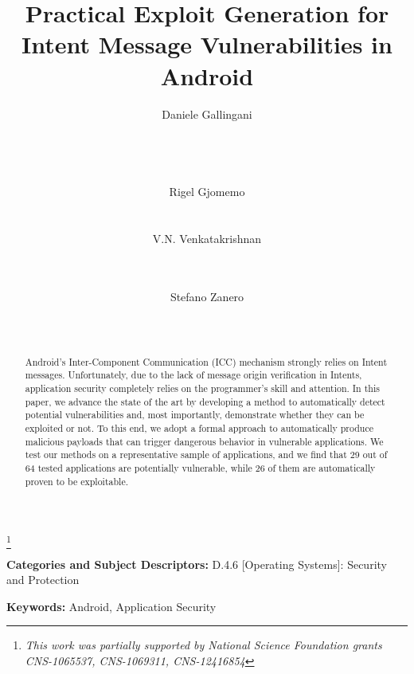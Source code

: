 \documentclass{sig-alternate-2013}
\author{
\alignauthor
Daniele Gallingani\\
      \affaddr{University of Illinois at Chicago}\\
      \affaddr{Chicago, IL}\\
      \affaddr{Politecnico di Milano}\\
      \affaddr{Milano, Italy}\\
      \email{daniele.gallingani@mail.polimi.it}
\alignauthor
Rigel Gjomemo\\
      \affaddr{University of Illinois at Chicago}\\
      \affaddr{Chicago, IL}\\
      \email{rgjome1@uic.edu}
\alignauthor
V.N. Venkatakrishnan\\
      \affaddr{University of Illinois at Chicago}\\
      \affaddr{Chicago, IL}\\
      \email{venkat@uic.edu}
\alignauthor
\and
Stefano Zanero\\
      \affaddr{Politecnico di Milano}\\
      \affaddr{Milano, Italy}\\
      \email{stefano.zanero@polimi.it}
}
\newcommand{\titled}{Practical Exploit Generation for Intent Message Vulnerabilities in Android}
\begin{document}
\title{\titled}
\maketitle
\let\thefootnote\relax\footnote{\it This work was partially supported by National Science Foundation
grants CNS-1065537, CNS-1069311, CNS-12416854}

\begin{abstract}
Android's Inter-Component Communication (ICC) mechanism strongly relies
on  Intent messages. Unfortunately, due to the lack of message
origin verification in Intents, application security completely relies on the
programmer's skill and attention. In this paper, we advance the state of the art 
by developing a method to automatically detect potential vulnerabilities and, most importantly, demonstrate
whether they can be exploited or not. To this end, we adopt a formal
approach to automatically produce malicious payloads that can trigger
dangerous behavior in vulnerable applications. We test our methods on a representative sample of applications, and we find that 29 out of 
64 tested applications are potentially vulnerable, while 
26 of them are automatically proven to be exploitable. 
\end{abstract}

\vspace{1mm}
\noindent
{\bf Categories and Subject Descriptors:} D.4.6 {[Operating Systems]}: {Security and Protection}

\vspace{1mm}
\noindent
{\bf Keywords:} Android, Application Security







%

% 

 

% 





\end{document}

